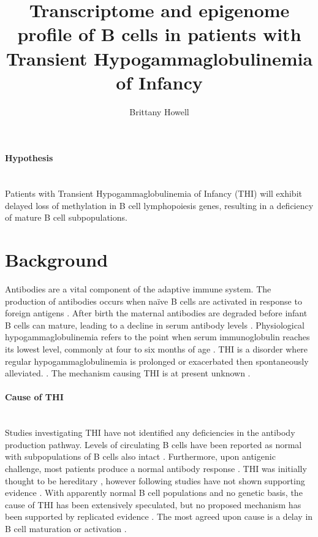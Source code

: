 \documentclass[12pt]{article}
\title{\vspace{-2cm} Transcriptome and epigenome profile of B cells in patients with Transient Hypogammaglobulinemia of Infancy}
\date{}
\author{Brittany Howell}
\newcommand{\naive}{na\"{i}ve }
\begin{document}
	\maketitle
	
	\paragraph{Hypothesis}
	~\\
	Patients with Transient Hypogammaglobulinemia of Infancy (THI) will exhibit delayed loss of methylation in B cell lymphopoiesis genes, resulting in a deficiency of mature B cell subpopulations.
	
	\section{Background}
		
		Antibodies are a vital component of the adaptive immune system. 
		The production of antibodies occurs when \naive B cells are activated in response to foreign antigens \citep{Simon15}.
		After birth the maternal antibodies are degraded before infant B cells can mature, leading to a decline in serum antibody levels \citep{Hasselquist09,Martin10,Rechavi15}.
		Physiological hypogammaglobulinemia refers to the point when serum immunoglobulin reaches its lowest level, commonly at four to six months of age \citep{Dressler89}.
		THI is a disorder where regular hypogammaglobulinemia is prolonged or exacerbated then spontaneously alleviated. \citep{Dressler89,AlHerz14,Gitlin56,AlHerz11,Rosen66,McGeady87,Stiemh80, Dalal98,Tiller78,Buckley83}.
		The mechanism causing THI is at present unknown \citep{AlHerz14}. 

			
		\paragraph{Cause of THI} 
			~\\
			Studies investigating THI have not identified any deficiencies in the antibody production pathway.
			Levels of circulating B cells have been reported as normal with subpopulations of B cells also intact \citep{Tiller78,Stiemh80,Siegel81,Buckley83,Fiorilli86,Dressler89}.
			Furthermore, upon antigenic challenge, most patients produce a normal antibody response \citep{Tiller78,Stiemh80,Buckley83,McGeady87,Dressler89,Dalal98}.
			THI was initially thought to be hereditary \citep{Willenbockel60, Soothill68}, however following studies have not shown supporting evidence \citep{Tiller78,Fiorilli86,Ovadia14}.
			With apparently normal B cell populations and no genetic basis, the cause of THI has been extensively speculated, but no proposed mechanism has been supported by replicated evidence \citep{Fudenberg64,Rosen66,Nathenson71,Willenbockel60,Soothill68,Tiller78,Fiorilli86,Ovadia14,Siegel81,McGeady87}.
			The most agreed upon cause is a delay in B cell maturation or activation \citep{McGeady87,Stiemh80,Walker94,Rosen84}. 
			
\end{document}
